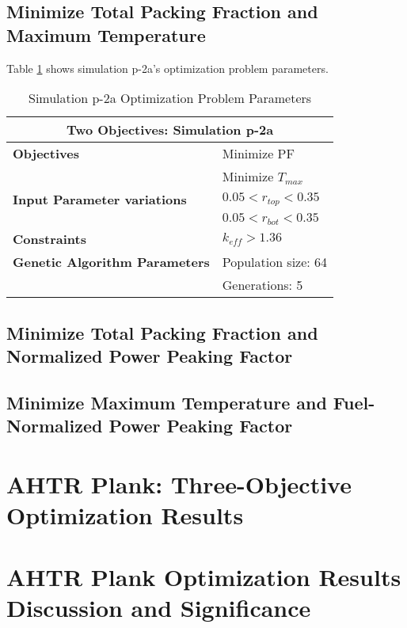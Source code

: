 \subsection{Minimize Total Packing Fraction and Maximum Temperature}
Table \ref{tab:simulationp2a} shows simulation p-2a's optimization problem parameters. 
\begin{table}[htbp]
    \centering
    \onehalfspacing
    \caption{Simulation p-2a Optimization Problem Parameters}
	\label{tab:simulationp2a}
    \footnotesize
    \begin{tabular}{l|p{3cm}}
    \hline 
    \multicolumn{2}{c}{\textbf{Two Objectives: Simulation p-2a}} \\
    \hline 
    \textbf{Objectives} & Minimize PF \\
    & Minimize $T_{max}$ \\
    \hline 
    \textbf{Input Parameter variations} & $0.05<r_{top}<0.35$ \\
    & $0.05<r_{bot}<0.35$ \\
    \hline
    \textbf{Constraints} & $k_{eff} > 1.36$\\ 
    \hline 
    \textbf{Genetic Algorithm Parameters} & Population size: 64 \\
    & Generations: 5 \\
    \hline
    \end{tabular}
\end{table}


\subsection{Minimize Total Packing Fraction and Normalized Power Peaking Factor}

\subsection{Minimize Maximum Temperature and Fuel-Normalized Power Peaking Factor}

\section{AHTR Plank: Three-Objective Optimization Results}

\section{AHTR Plank Optimization Results Discussion and Significance}
